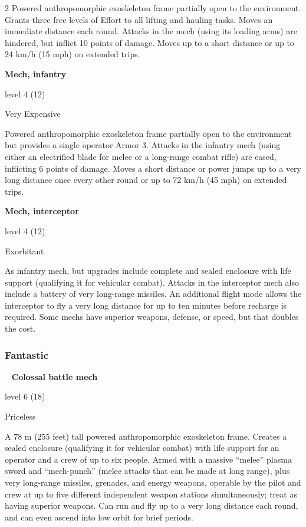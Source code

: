 \begin{multicols}{2}
Powered anthropomorphic exoskeleton frame partially open to the environment. Grants three free levels of Effort to all lifting and hauling tasks. Moves an immediate distance each round. Attacks in the mech (using its loading arms) are hindered, but inflict 10 points of damage. Moves up to a short distance or up to 24 km/h (15 mph) on extended trips. 

\textbf{Mech, infantry}

level 4 (12) 

Very Expensive 

Powered anthropomorphic exoskeleton frame partially open to the environment but provides a single operator Armor 3. Attacks in the infantry mech (using either an electrified blade for melee or a long-range combat rifle) are eased, inflicting 6 points of damage. Moves a short distance or power jumps up to a very long distance once every other round or up to 72 km/h (45 mph) on extended trips. 

\textbf{Mech, interceptor} 

level 4 (12) 

Exorbitant 

As infantry mech, but upgrades include complete and sealed enclosure with life support (qualifying it for vehicular combat). Attacks in the interceptor mech also include a battery of very long-range missiles. An additional flight mode allows the interceptor to fly a very long distance for up to ten minutes before recharge is required. Some mechs have superior weapons, defense, or speed, but that doubles the cost. 

\subsubsection{Fantastic}
 
\textbf{Colossal battle mech}

level 6 (18) 

Priceless 

A 78 m (255 feet) tall powered anthropomorphic exoskeleton frame. Creates a sealed enclosure (qualifying it for vehicular combat) with life support for an operator and a crew of up to six people. Armed with a massive “melee” plasma sword and “mech-punch” (melee attacks that can be made at long range), plus very long-range missiles, grenades, and energy weapons, operable by the pilot and crew at up to five different independent weapon stations simultaneously; treat as having superior weapons. Can run and fly up to a very long distance each round, and can even ascend into low orbit for brief periods.


\end{multicols}
